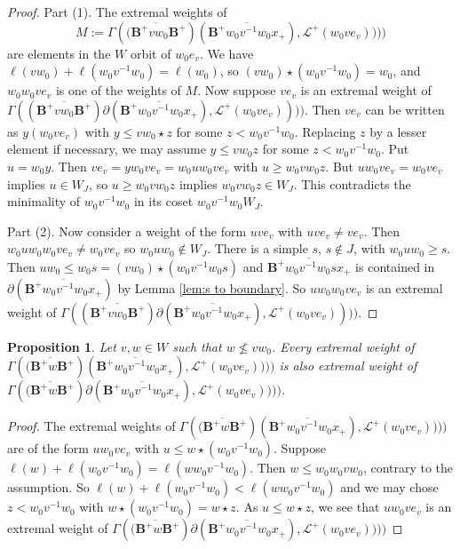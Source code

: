 \documentclass[sn-mathphys-num]{sn-jnl}%
\newcommand{\Ll}{\mathcal L}
\newcommand{\fb}{\mathbf B}
\newtheorem{proposition}[theorem]{Proposition}
\theoremstyle{definition}
\begin{document}
\begin{proof}Part (1).
 The extremal weights of 
 $$M:=\Gamma(\overline{({\fb}^+vw_0{\fb}^+})(\overline{{\fb}^+w_0v^{-1}w_0x_+}),\Ll^+(w_0ve_v))))$$ are  elements in the $W$ orbit of $w_0e_v$.
 We have
 $\ell(vw_0)+\ell(w_0v^{-1}w_0)=\ell(w_0)$, so  $(vw_0)\star (w_0v^{-1}w_0)=w_0$, and $w_0w_0ve_v$ is one of the weights of $M$.
 Now suppose $ve_v$ is  an extremal weight of 
$\Gamma((\overline{{\fb}^+vw_0\fb^+})
\partial(\overline{{\fb}^+w_0v^{-1}w_0x_+}),\Ll^+(w_0ve_v))))$.
Then $ve_v$ can be written as $y(w_0ve_v)$ with $y\leq vw_0\star z$ for some $z<w_0v^{-1}w_0$.
Replacing $z$ by a lesser element if necessary, we may assume $y\leq vw_0z$ for some $z<w_0v^{-1}w_0$.
Put $u=w_0y$. Then $ve_v=yw_0ve_v=w_0uw_0ve_v$ with $u\geq w_0vw_0z$. But $uw_0ve_v=w_0ve_v$ implies $u\in W_J$, so 
$u\geq w_0vw_0z$ implies $w_0vw_0z\in W_J$. This contradicts the minimality of $w_0v^{-1}w_0$ in its coset $w_0v^{-1}w_0W_J$.

Part (2). Now consider a weight of the form $uve_v$ with $uve_v\neq ve_v$. 
Then $w_0uw_0w_0ve_v\neq w_0ve_v$ so $w_0uw_0\notin W_J$. There is a simple $s$, $s\notin J$, with $w_0uw_0\geq s$.
Then $uw_0\leq w_0s=(vw_0)\star (w_0v^{-1}w_0s)$ and $\overline{{\fb}^+w_0v^{-1}w_0sx_+}$ is contained in 
$\partial(\overline{\fb^+w_0v^{-1}w_0x_+})$ by Lemma \ref{lem:s to boundary}. So $uw_0w_0ve_v$ is an extremal weight of
$\Gamma((\overline{{\fb}^+vw_0\fb^+})
\partial(\overline{{\fb}^+w_0v^{-1}w_0x_+}),\Ll^+(w_0ve_v))))$.
 \end{proof}

 \begin{proposition}\label{prop:w notless vw_0}
 Let $v,w\in W$ such that $w\nleq vw_0$.
 Every extremal weight of $\Gamma(\overline{({\fb}^+w{\fb}^+})(\overline{{\fb}^+w_0v^{-1}w_0x_+}),\Ll^+(w_0ve_v))))$  is also extremal weight of 
$\Gamma(\overline{({\fb}^+w{\fb}^+})\partial(\overline{{\fb}^+w_0v^{-1}w_0x_+}),\Ll^+(w_0ve_v))))$.

 \end{proposition}
 
 \begin{proof}
 The extremal weights of  $\Gamma(\overline{({\fb}^+w{\fb}^+})(\overline{{\fb}^+w_0v^{-1}w_0x_+}),\Ll^+(w_0ve_v))))$ are of the form
 $uw_0ve_v$ with $u\leq w\star (w_0v^{-1}w_0)$. Suppose $\ell(w)+\ell(w_0v^{-1}w_0)=\ell(ww_0v^{-1}w_0)$.
 Then $w\leq w_0w_0vw_0$, contrary to the assumption. So $\ell(w)+\ell(w_0v^{-1}w_0)<\ell(ww_0v^{-1}w_0)$
 and we may chose $z<w_0v^{-1}w_0$ with $w\star (w_0v^{-1}w_0)=w\star z$. As $u\leq w\star z$, we see that $uw_0ve_v$ is an extremal 
 weight of $\Gamma(\overline{({\fb}^+w{\fb}^+})\partial(\overline{{\fb}^+w_0v^{-1}w_0x_+}),\Ll^+(w_0ve_v))))$
 \end{proof}
\end{document}
